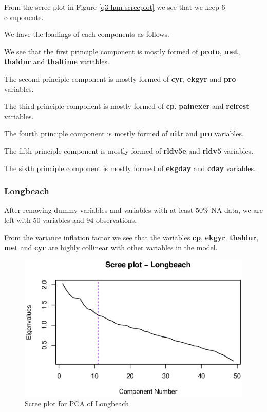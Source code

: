 \documentclass[a4paper]{article}
\begin{document}
From the scree plot in Figure \ref{q3-hun-screeplot} we see that we keep 6 components.

We have the loadings of each components as follows.



We see that the first principle component is mostly formed of \textbf{proto}, \textbf{met}, \textbf{thaldur} and \textbf{thaltime} variables.

The second principle component is mostly formed of \textbf{cyr}, \textbf{ekgyr} and \textbf{pro} variables.

The third principle component is mostly formed of \textbf{cp}, \textbf{painexer} and \textbf{relrest} variables.

The fourth principle component is mostly formed of \textbf{nitr} and \textbf{pro} variables.

The fifth principle component is mostly formed of \textbf{rldv5e} and \textbf{rldv5} variables.

The sixth principle component is mostly formed of \textbf{ekgday} and \textbf{cday} variables.

\subsubsection{Longbeach}

After removing dummy variables and variables with at least $50\%$ NA data, we are left with 50 variables and 94 observations.



From the variance inflation factor we see that the variables \textbf{cp}, \textbf{ekgyr}, \textbf{thaldur}, \textbf{met} and \textbf{cyr} are highly collinear with other variables in the model.

\begin{figure}[H]
	\begin{center}
		\includegraphics[width=12cm]{question3output/lonscreeplot.eps}
	\end{center}
	\caption{Scree plot for PCA of Longbeach}
	\label{q3-lon-screeplot}
\end{figure}
\end{document}
